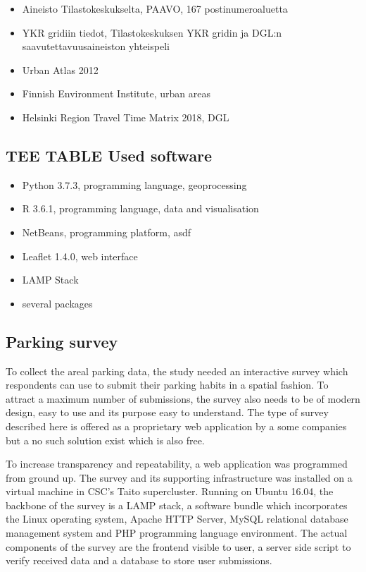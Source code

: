 \begin{itemize}
    \item Aineisto Tilastokeskukselta, PAAVO, 167 postinumeroaluetta
    \item YKR gridiin tiedot, Tilastokeskuksen YKR gridin ja DGL:n saavutettavuusaineiston yhteispeli
    \item Urban Atlas 2012
    \item Finnish Environment Institute, urban areas
    \item Helsinki Region Travel Time Matrix 2018, DGL
\end{itemize}

\subsection{TEE TABLE Used software}
\justify

\begin{itemize}
    \item Python 3.7.3, programming language, geoprocessing
    \item R 3.6.1, programming language, data and visualisation
    \item NetBeans, programming platform, asdf
    \item Leaflet 1.4.0, web interface
    \item LAMP Stack
    \item several packages
\end{itemize}

\subsection{Parking survey}
\justify
To collect the areal parking data, the study needed an interactive survey which respondents can use to submit their parking habits in a spatial fashion. To attract a maximum number of submissions, the survey also needs to be of modern design, easy to use and its purpose easy to understand. The type of survey described here is offered as a proprietary web application by a some companies but a no such solution exist which is also free. 

To increase transparency and repeatability, a web application was programmed from ground up. The survey and its supporting infrastructure was installed on a virtual machine in CSC's Taito supercluster. Running on Ubuntu 16.04, the backbone of the survey is a LAMP stack, a software bundle which incorporates the Linux operating system, Apache HTTP Server, MySQL relational database management system and PHP programming language environment. The actual components of the survey are the frontend visible to user, a server side script to verify received data and a database to store user submissions. 


